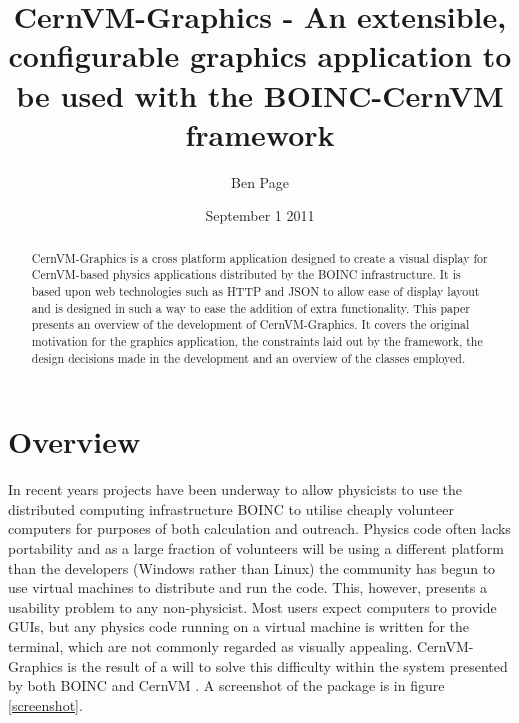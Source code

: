 \documentclass[twocolumn,aps]{revtex4}
\newcommand{\cernvm}{CernVM}
\newcommand{\cernvmgraphics}{\cernvm{}-Graphics}
\newcommand{\boinc}{BOINC}
\newcommand{\json}{JSON}
\begin{document}
  \title
  {
    \cernvmgraphics{} - An extensible, configurable graphics application to 
    be used with the \boinc{}-\cernvm{} framework 
  }

  \date{ September 1 2011 }
  \author{ Ben Page }
  \noaffiliation

  \begin{abstract}
    \cernvmgraphics{} is a cross platform application designed to create a 
    visual display for \cernvm{}-based physics applications distributed by 
    the \boinc{} infrastructure. It is based upon web technologies such as 
    HTTP and \json{} to allow ease of display layout and is designed in such
    a way to ease the addition of extra functionality.
    This paper presents an overview of the development of \cernvmgraphics{}.
    It covers the original motivation for the graphics application, the
    constraints laid out by the framework, the design decisions made in 
    the development and an overview of the classes employed.
  \end{abstract}

  \maketitle

  \section{ Overview }
    In recent years projects have been underway to allow physicists to use
    the distributed computing infrastructure \boinc{} 
    \cite{boincIntroduction} to utilise cheaply volunteer computers for 
    purposes of both calculation and outreach. Physics code often lacks 
    portability and as a large fraction of volunteers will be using a 
    different platform than the developers (Windows rather than Linux) the 
    community has begun to use virtual machines to distribute and run the 
    code. This, however, presents a usability problem to any non-physicist.
    Most users expect computers to provide GUIs, but any physics code
    running on a virtual machine is written for the terminal, which are not 
    commonly regarded as visually appealing. \cernvmgraphics{} is the result
    of a will to solve this difficulty within the system presented by both 
    \boinc{} and \cernvm{} \cite{cernvmIntroduction}. A screenshot of the 
    package is in figure \ref{screenshot}.
\end{document}
